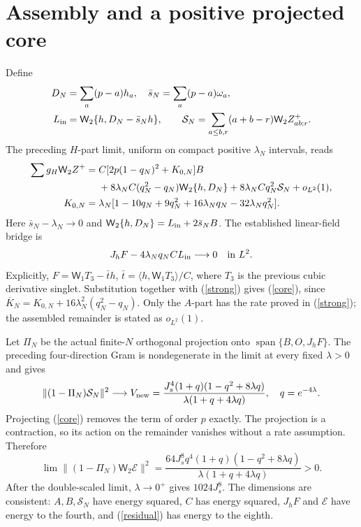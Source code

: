 \documentclass[11pt,a4paper]{article}
\newcommand{\W}{\mathsf W_2}
\newcommand{\core}{\mathcal E}
\begin{document}
\newpage
\section{Assembly and a positive projected core}
Define
\begin{align}
 D_N&=\sum_a(p-a)h_a,\quad \bar s_N=\sum_a(p-a)\omega_a,\\
 L_{\rm in}&=\W\{h,D_N-\bar s_Nh\},\qquad
 \mathcal S_N=\sum_{a\leq b,r}(a+b-r)\W Z^+_{ab;r}.
\end{align}
The preceding $H$-part limit, uniform on compact positive
$\lambda_N$ intervals, reads
\begin{align}
 \sum g_H\W Z^+={}&C[2p(1-q_N)^2+K_{0,N}]B\notag\\
 &+8\lambda_NC(q_N^2-q_N)\W\{h,D_N\}
 +8\lambda_NCq_N^2\mathcal S_N+o_{L^2}(1),\\
 K_{0,N}={}&\lambda_N[1-10q_N+9q_N^2
                    +16\lambda_Nq_N-32\lambda_Nq_N^2].\notag
\end{align}
Here $\bar s_N-\lambda_N\to0$ and
$\W\{h,D_N\}=L_{\rm in}+2\bar s_NB$.
The established linear-field bridge is
\begin{equation}
 J_hF-4\lambda_Nq_N C L_{\rm in}\longrightarrow0\quad\hbox{in }L^2.
\end{equation}
Explicitly, $F=\mathsf W_1T_3-\bar t h$,
$\bar t=\langle h,\mathsf W_1T_3\rangle/C$, where $T_3$ is the
previous cubic derivative singlet. Substitution together with
(\ref{strong}) gives (\ref{core}), since
$\overline K_N=K_{0,N}+16\lambda_N^2(q_N^2-q_N)$.
Only the $A$-part has the rate proved in (\ref{strong}); the assembled
remainder is stated as $o_{L^2}(1)$.

Let $\Pi_N$ be the actual finite-$N$ orthogonal projection onto
$\operatorname{span}\{B,O,J_hF\}$. The preceding four-direction
Gram is nondegenerate in the limit at every fixed $\lambda>0$ and gives
\begin{equation}
 \|(1-\Pi_N)\mathcal S_N\|^2\longrightarrow V_{\rm new}
 =\frac{J_s^4(1+q)(1-q^2+8\lambda q)}{\lambda(1+q+4\lambda q)},
 \quad q=e^{-4\lambda}.
\end{equation}
Projecting (\ref{core}) removes the term of order $p$ exactly.
The projection is a contraction, so its action on the remainder
vanishes without a rate assumption. Therefore
\begin{equation}
 \boxed{\ \lim\|(1-\Pi_N)\W\core\|^2
 =\frac{64J_s^8q^4(1+q)(1-q^2+8\lambda q)}
 {\lambda(1+q+4\lambda q)}>0.\ }\label{residual}
\end{equation}
After the double-scaled limit, $\lambda\to0^+$ gives $1024J_s^8$.
The dimensions are consistent: $A,B,\mathcal S_N$ have energy squared,
$C$ has energy squared, $J_hF$ and $\core$ have energy to the fourth,
and (\ref{residual}) has energy to the eighth.
\end{document}
